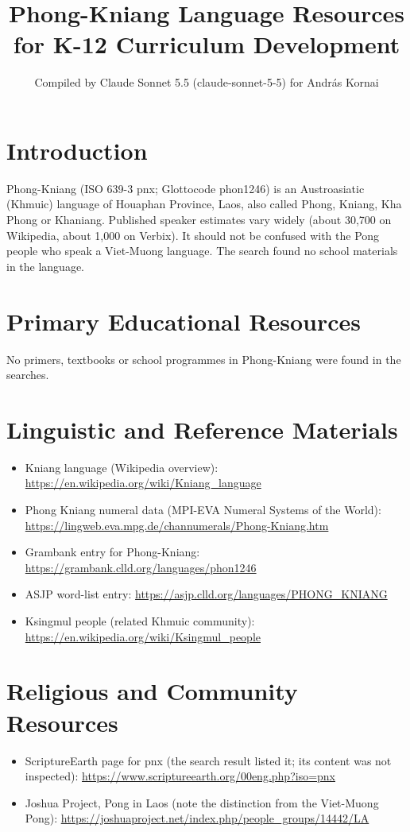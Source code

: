 \documentclass[12pt]{article}
\title{Phong-Kniang Language Resources for K-12 Curriculum Development}
\author{Compiled by Claude Sonnet 5.5 (claude-sonnet-5-5) for Andr\'as Kornai}
\date{}
\begin{document}
\maketitle

\section{Introduction}
Phong-Kniang (ISO 639-3 pnx; Glottocode phon1246) is an Austroasiatic (Khmuic) language of Houaphan Province, Laos, also called Phong, Kniang, Kha Phong or Khaniang. Published speaker estimates vary widely (about 30,700 on Wikipedia, about 1,000 on Verbix). It should not be confused with the Pong people who speak a Viet-Muong language. The search found no school materials in the language.

\section{Primary Educational Resources}
No primers, textbooks or school programmes in Phong-Kniang were found in the searches.

\section{Linguistic and Reference Materials}
\begin{itemize}
\item Kniang language (Wikipedia overview): \url{https://en.wikipedia.org/wiki/Kniang_language}
\item Phong Kniang numeral data (MPI-EVA Numeral Systems of the World): \url{https://lingweb.eva.mpg.de/channumerals/Phong-Kniang.htm}
\item Grambank entry for Phong-Kniang: \url{https://grambank.clld.org/languages/phon1246}
\item ASJP word-list entry: \url{https://asjp.clld.org/languages/PHONG_KNIANG}
\item Ksingmul people (related Khmuic community): \url{https://en.wikipedia.org/wiki/Ksingmul_people}
\end{itemize}

\section{Religious and Community Resources}
\begin{itemize}
\item ScriptureEarth page for pnx (the search result listed it; its content was not inspected): \url{https://www.scriptureearth.org/00eng.php?iso=pnx}
\item Joshua Project, Pong in Laos (note the distinction from the Viet-Muong Pong): \url{https://joshuaproject.net/index.php/people_groups/14442/LA}
\end{itemize}
\end{document}
